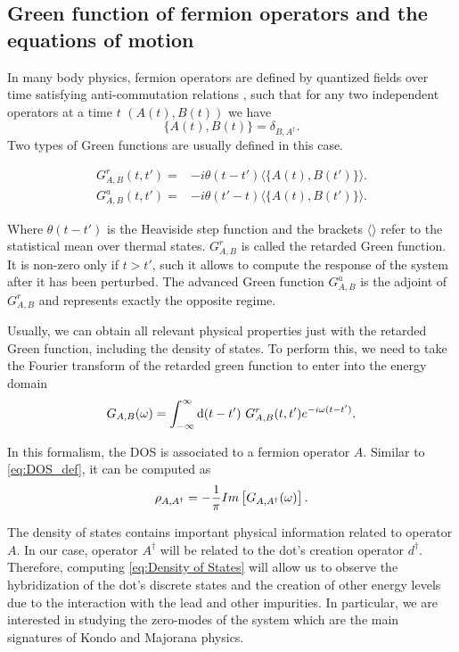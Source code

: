 \subsection{Green function of fermion operators and the equations of motion}

 In many body physics, fermion operators are defined by quantized fields over time satisfying anti-commutation relations , such that for any two independent operators at a time $t$ $(A(t)  , B(t))$  we have
 \begin{equation}
    \{ A(t) , B(t) \} = \delta_{B,A^\dagger} .
 \end{equation}
\noindent  Two types of Green functions are usually defined in this case.

 \begin{align}
  G^r_{A,B}(t,t') =& -i\theta(t-t')\langle \{ A(t) , B(t') \} \rangle  .  \label{eq:TempGreen}  \\
   G^a_{A,B}(t,t') =& -i\theta(t'-t)\langle \{ A(t) , B(t') \} \rangle  .
 \end{align}
  
\noindent Where $\theta(t-t')$ is the Heaviside step function and  the brackets $\langle \rangle$ refer to the statistical mean over thermal states. $G^r_{A,B}$ is called the retarded Green function. It is non-zero only if $t>t'$, such it allows to compute the response of the system after it has been perturbed. 
 The advanced Green function $G^a_{A,B}$ is the adjoint of $G^r_{A,B}$ and represents exactly the opposite regime. 

  Usually, we can obtain all relevant physical properties just with the retarded Green function, including the density of states.  To perform this, we need to take the Fourier transform of the retarded green function to enter into the energy domain
\begin{equation}
   G_{A,B}(\omega)=\int_{-\infty}^{\infty}\text{d}(t-t')\  G^r_{A,B}(t,t')e^{-i\omega(t-t')}.
\end{equation}

 \noindent In this formalism, the DOS is associated to a fermion operator $A$. Similar to  \eqref{eq:DOS_def}, it can be computed as 
\begin{equation}
    \rho_{A,A^\dagger}=-\frac{1}{\pi}Im\left[G_{A,A^\dagger}(\omega)\right].
    \label{eq:Density of States}
\end{equation}

The density of states contains important physical information related to operator $A$. In our case, operator $A^\dagger$ will be related to the dot's creation operator  $d^\dagger$. Therefore,  computing \eqref{eq:Density of States} will allow us to observe the hybridization of the dot's discrete states and the creation of other energy levels due to the interaction with the lead and other impurities. In particular, we are interested in studying the zero-modes of the system which are the main signatures of Kondo and Majorana physics. 



